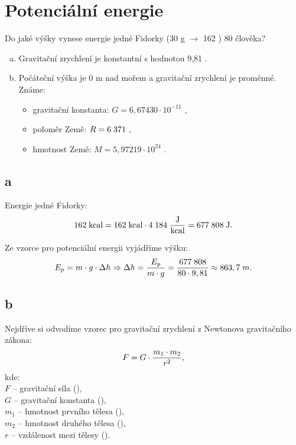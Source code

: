 \documentclass{article}
\begin{document}
\maketitle
\tableofcontents
\newpage




\section{ Potenciální energie \spicy}
Do jaké výšky vynese energie jedné Fidorky (30 g $\rightarrow$ 162 \ueqKCAL) 80 \ueqKG \fs člověka?
\begin{enumerate}[a)]
    \item Gravitační zrychlení je konstantní s hodnotou 9,81 \ueqMandSinvsq.
    \item Počáteční výška je 0 m nad mořem a gravitační zrychlení je proměnné. Známe:
          \begin{itemize}
              \item gravitační konstanta: $G = 6,67430 \cdot 10^{-11}$ \ueqNandMsqKGinvsq,
              \item poloměr Země: $R = 6 \; 371$ \ueqKM,
              \item hmotnost Země: $M = 5,97219 \cdot 10^{24}$ \ueqKG.
          \end{itemize}
\end{enumerate}



\subsection{a}
Energie jedné Fidorky:
$$
    162 \; \textrm{kcal} = 162 \; \textrm{kcal} \cdot 4 \; 184 \; \frac{\textrm{J}}{\textrm{kcal}} = 677 \; 808 \; \textrm{J}.
$$

Ze vzorce pro potenciální energii vyjádříme výšku:
$$
    E_p = m \cdot g \cdot \Delta h \Rightarrow \Delta h = \frac{E_p}{m \cdot g} = \frac{677 \; 808}{80 \cdot 9,81} \approx 863,7 \; m.
$$



\subsection{b \spicy \spicy \spicy}
Nejdříve si odvodíme vzorec pro gravitační zrychlení z Newtonova gravitačního zákona:
\begin{equation}
    F = G \cdot \frac{m_1 \cdot m_2}{r^2},
    \unit{(\ueqN)}
\end{equation}
kde:\\
$F$ -- gravitační síla (\ueqN),\\
$G$ -- gravitační konstanta (\ueqNandMsqKGinvsq),\\
$m_1$ -- hmotnost prvního tělesa (\ueqKG),\\
$m_2$ -- hmotnost druhého tělesa (\ueqKG),\\
$r$ -- vzdálenost mezi tělesy (\ueqM).\\
\end{document}

